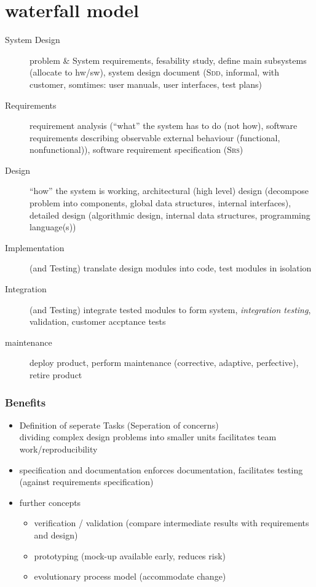 \documentclass[a4paper, 10pt]{article}
\begin{document}
\section{waterfall model}


\begin{description}
	\item[System Design] problem \& System requirements, fesability study, define main subsystems (allocate to hw/sw), system design document (\textsc{Sdd}, informal, with customer, somtimes: user manuals, user interfaces, test plans)
	\item[Requirements] requirement analysis (``what'' the system has to do (not how), software requirements describing observable external behaviour (functional, nonfunctional)), software requirement specification (\textsc{Srs})
	\item[Design] ``how'' the system is working, architectural (high level) design (decompose problem into components, global data structures, internal interfaces), detailed design (algorithmic design, internal data structures, programming language(s))
	\item[Implementation] (and Testing) \follows translate design modules into code, test modules in isolation
	\item[Integration] (and Testing) integrate tested modules to form system, \emph{integration testing}, validation, customer accptance tests
	\item[maintenance] deploy product, perform maintenance (corrective, adaptive, perfective), retire product
\end{description}
\subsubsection{Benefits}
\begin{itemize}
	\item Definition of seperate Tasks (Seperation of concerns)\\dividing complex design problems into smaller units \follows facilitates team work/reproducibility
	\item specification and documentation  \follows enforces documentation, facilitates testing (against requirements specification)
	\item further concepts
		\begin{itemize}
			\item verification / validation (compare intermediate results with requirements and design)
			\item prototyping (mock-up available early, reduces risk)
			\item evolutionary process model (accommodate change)
		\end{itemize}
\end{itemize}
\end{document}

